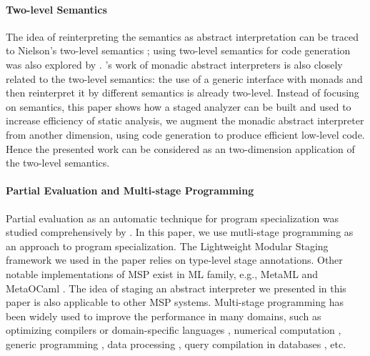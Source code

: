 \paragraph{Two-level Semantics} The idea of reinterpreting the semantics as
abstract interpretation can be traced to Nielson's two-level semantics
\cite{NIELSON1989117}; using two-level semantics for code generation
was also explored by \citet{NIELSON198859}.
\citet{Sergey:2013:MAI:2491956.2491979}'s work of monadic abstract
interpreters is also closely related to the two-level semantics: the
use of a generic interface with monads and then reinterpret it by
different semantics is already two-level. Instead of focusing on
semantics, this paper shows how a staged analyzer can be built and
used to increase efficiency of static analysis, we augment the monadic
abstract interpreter from another dimension, using code generation to
produce efficient low-level code. Hence the presented work can be
considered as an two-dimension application of the two-level semantics.

\paragraph{Partial Evaluation and Multi-stage Programming}
Partial evaluation as an automatic technique for program
specialization was studied comprehensively by
\citet{10.1007/3-540-61580-6_11, DBLP:books/daglib/0072559}.  In this
paper, we use mutli-stage programming as an approach to program
specialization. The Lightweight Modular Staging framework
\cite{DBLP:conf/gpce/RompfO10} we used in the paper relies on
type-level stage annotations.  Other notable implementations of MSP
exist in ML family, e.g., MetaML \cite{DBLP:conf/pepm/TahaS97} and
MetaOCaml \cite{DBLP:conf/gpce/CalcagnoTHL03,
  DBLP:conf/flops/Kiselyov14}.  The idea of staging an abstract
interpreter we presented in this paper is also applicable to other MSP
systems.  Multi-stage programming has been widely used to improve the
performance in many domains, such as optimizing compilers or
domain-specific languages \cite{DBLP:conf/pldi/RompfSBLCO14,
  DBLP:conf/snapl/RompfBLSJAOSKDK15,
  DBLP:journals/tecs/SujeethBLRCOO14, DBLP:conf/gpce/SujeethGBLROO13,
  DBLP:journals/jfp/CaretteKS09}, numerical computation \cite{PGL-038,
  DBLP:conf/pepm/AktemurKKS13}, generic programming
\cite{DBLP:journals/pacmpl/Yallop17,
  Ofenbeck:2017:SGP:3136040.3136060}, data processing
\cite{DBLP:conf/oopsla/JonnalageddaCSRO14,
  DBLP:conf/popl/KiselyovBPS17}, query compilation in databases
\cite{DBLP:conf/osdi/EssertelTDBOR18, DBLP:conf/sigmod/TahboubER18},
etc.

